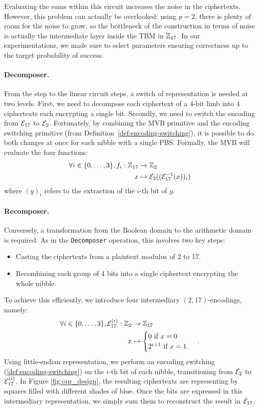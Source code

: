 Evaluating the sums within this circuit increases the noise in the ciphertexts. However, this problem can actually be overlooked: using $p=2$, there is plenty of room for the noise to grow, so the bottleneck of the construction in terms of noise is actually the intermediate layer inside the TBM in $\mathbb{Z}_{17}$. In our experimentations, we made sure to select parameters ensuring correctness up to the target probability of success.


\paragraph{Decomposer.} From the \SubBytes step to the linear circuit steps, a switch of representation is needed at two levels. First, we need to decompose each ciphertext of a 4-bit limb into 4 ciphertexts each encrypting a single bit. Secondly, we need to switch the encoding from $\mathcal{E}_{17}$ to $\mathcal{E}_2$. Fortunately, by combining the MVB primitive and the encoding switching primitive (from Definition~\ref{def:encoding-switching}), it is possible to do both changes at once for each nibble with a single PBS. Formally, the MVB will evaluate the four functions:
\begin{align*}
    \forall i \in \{0, \dots, 3\}, f_i: \mathbb{Z}_{17} &\rightarrow \mathbb{Z}_2\\
                                       x &\mapsto \mathcal{E}_2((\mathcal{E}_{17}^{-1}(x))_i)
\end{align*}
where $(y)_i$ refers to the extraction of the $i$-th bit of $y$.


\paragraph{Recomposer.} Conversely, a transformation from the Boolean domain to the arithmetic domain is required. As in the \texttt{Decomposer} operation, this involves two key steps:
\begin{itemize}
    \item Casting the ciphertexts from a plaintext modulus of 2 to 17.
    \item Recombining each group of 4 bits into a single ciphertext encrypting the whole nibble.
\end{itemize}
To achieve this efficiently, we introduce four intermediary $(2, 17)$-encodings, namely:
\begin{align*}
    \forall i \in \{0, \dots, 3\}, \mathcal{E}_{17}^{(i)}: \mathbb{Z}_2 &\rightarrow \mathbb{Z}_{17}\\
    x &\mapsto \begin{cases}
    0 \text{ if } x=0\\
    2^{i+1} \text{ if } x=1.
    \end{cases}.
\end{align*}
%
Using little-endian representation, we perform an encoding switching (\ref{def:encoding-switching}) on the $i$-th bit of each nibble, transitioning from $\mathcal{E}_2$ to $\mathcal{E}_{17}^{(i)}$. In Figure \ref{fig:our_design}, the resulting ciphertexts are representing by squares filled with different shades of blue. Once the bits are expressed in this intermediary representation, we simply sum them to reconstruct the result in $\mathcal{E}_{17}$.

